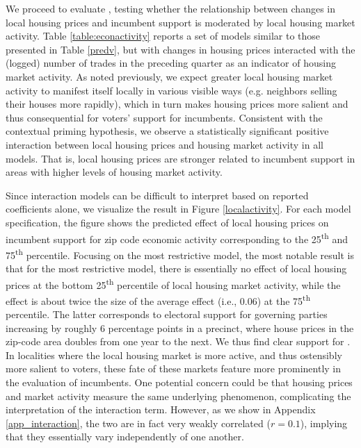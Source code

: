 \documentclass[12pt,a4paper]{article}
\begin{document}
	We proceed to evaluate \htwo, testing whether the relationship between changes in local housing prices and incumbent support is moderated by local housing market activity. Table \ref{table:econactivity} reports a set of models similar to those presented in Table \ref{predv}, but with changes in housing prices interacted with the (logged) number of trades in the preceding quarter as an indicator of housing market activity. As noted previously, we expect greater local housing market activity to manifest itself locally in various visible ways (e.g. neighbors selling their houses more rapidly), which in turn makes housing prices more salient and thus consequential for voters’ support for incumbents. Consistent with the contextual priming hypothesis, we observe a statistically significant positive interaction between local housing prices and housing market activity in all models. That is, local housing prices are stronger related to incumbent support in areas with higher levels of housing market activity.
	
	
	
	Since interaction models can be difficult to interpret based on reported coefficients alone, we visualize the result in Figure \ref{localactivity}. For each model specification, the figure shows the predicted effect of local housing prices on incumbent support for zip code economic activity corresponding to the 25\textsuperscript{th} and 75\textsuperscript{th} percentile. Focusing on the most restrictive model, the most notable result is that for the most restrictive model, there is essentially no effect of local housing prices at the bottom 25\textsuperscript{th} percentile of local housing market activity, while the effect is about twice the size of the average effect  (i.e., 0.06) at the 75\textsuperscript{th} percentile. The latter corresponds to electoral support for governing parties increasing by roughly 6 percentage points in a precinct, where house prices in the zip-code area doubles from one year to the next. We thus find clear support for \htwo. In localities where the local housing market is more active, and thus ostensibly more salient to voters, these fate of these markets feature more prominently in the evaluation of incumbents. One potential concern could be that housing prices and market activity measure the same underlying phenomenon, complicating the interpretation of the interaction term. However, as we show in Appendix \ref{app_interaction}, the two are in fact very weakly correlated ($r=0.1$), implying that they essentially vary independently of one another.
	
\end{document}
